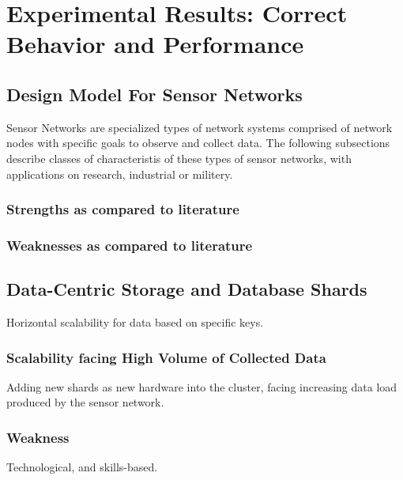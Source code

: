 

\chapter{Experimental Results: Correct Behavior and Performance}

\section{Design Model For Sensor Networks}

Sensor Networks are specialized types of network systems comprised of network 
nodes with specific goals to observe and collect data. The following
subsections describe classes of characteristis of these types of sensor
networks, with applications on research, industrial or militery.

\subsection{Strengths as compared to literature}

\subsection{Weaknesses as compared to literature}

\section{Data-Centric Storage and Database Shards}

Horizontal scalability for data based on specific keys.

\subsection{Scalability facing High Volume of Collected Data}

Adding new shards as new hardware into the cluster, facing increasing data load
produced by the sensor network.

\subsection{Weakness}

Technological, and skills-based.